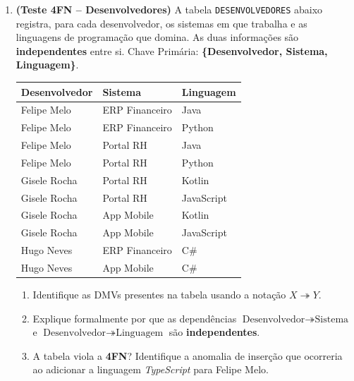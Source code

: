 \documentclass[12pt]{article}
\begin{document}
\begin{enumerate}[label=\textbf{Questão \arabic*:}, leftmargin=*]
  \vspace{0.4cm}

  \item \textbf{(Teste 4FN -- Desenvolvedores)} A tabela \texttt{DESENVOLVEDORES} abaixo registra, para cada desenvolvedor, os sistemas em que trabalha e as linguagens de programação que domina. As duas informações são \textbf{independentes} entre si. Chave Primária: \textbf{\{Desenvolvedor, Sistema, Linguagem\}}.

  \vspace{0.2cm}
  \centering
  \begin{tabular}{|l|l|l|}
    \hline
    \textbf{Desenvolvedor} & \textbf{Sistema} & \textbf{Linguagem} \\ \hline
    Felipe Melo  & ERP Financeiro  & Java       \\ \hline
    Felipe Melo  & ERP Financeiro  & Python     \\ \hline
    Felipe Melo  & Portal RH       & Java       \\ \hline
    Felipe Melo  & Portal RH       & Python     \\ \hline
    Gisele Rocha & Portal RH       & Kotlin     \\ \hline
    Gisele Rocha & Portal RH       & JavaScript \\ \hline
    Gisele Rocha & App Mobile      & Kotlin     \\ \hline
    Gisele Rocha & App Mobile      & JavaScript \\ \hline
    Hugo Neves   & ERP Financeiro  & C\#        \\ \hline
    Hugo Neves   & App Mobile      & C\#        \\ \hline
  \end{tabular}
  \flushleft
  \vspace{0.2cm}
  \begin{enumerate}[label=\alph*)]
    \item Identifique as DMVs presentes na tabela usando a notação $X \twoheadrightarrow Y$.
    \item Explique formalmente por que as dependências $\text{Desenvolvedor} \twoheadrightarrow \text{Sistema}$ e $\text{Desenvolvedor} \twoheadrightarrow \text{Linguagem}$ são \textbf{independentes}.
    \item A tabela viola a \textbf{4FN}? Identifique a anomalia de inserção que ocorreria ao adicionar a linguagem \textit{TypeScript} para Felipe Melo.
  \end{enumerate}


\end{enumerate}
\end{document}
